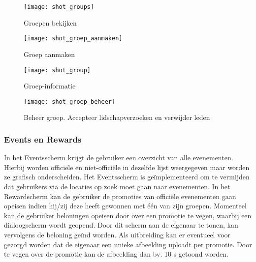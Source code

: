 \begin{figure}[ht]

\begin{minipage}[b]{0.25\linewidth}
\centering
\texttt{[image: shot\_groups]}
\caption{Groepen bekijken}
\label{fig:shot_groups}
\end{minipage}
\hspace{1cm}
\begin{minipage}[b]{0.25\linewidth}
\centering
\texttt{[image: shot\_groep\_aanmaken]}
\caption{Groep aanmaken}
\label{fig:shot_groep_aanmaken}
\end{minipage}
\hspace{1cm}
\begin{minipage}[b]{0.25\linewidth}
\centering
\texttt{[image: shot\_group]}
\caption{Groep-informatie}
\label{fig:shot_group}
\end{minipage}

\end{figure}

\begin{figure}[ht]
\centering
\begin{minipage}[b]{0.5\linewidth}
\centering
\texttt{[image: shot\_groep\_beheer]}
\caption{Beheer groep. Accepteer lidschapverzoeken en verwijder leden}
\label{fig:shot_groep_beheer}
\end{minipage}


\end{figure}

\clearpage

\subsubsection{Events en Rewards}%
In het Eventsscherm krijgt de gebruiker een overzicht van alle evenementen. Hierbij worden officiële en niet-officiële in dezelfde lijst weergegeven maar worden ze grafisch onderscheiden. Het Eventsscherm is geïmplementeerd om te vermijden dat gebruikers via de locaties op zoek moet gaan naar evenementen.
In het Rewardscherm kan de gebruiker de promoties van officiële evenementen gaan opeisen indien hij/zij deze heeft gewonnen met één van zijn groepen. Momenteel kan de gebruiker beloningen opeisen door over een promotie te vegen, waarbij een dialoogscherm wordt geopend. Door dit scherm aan de eigenaar te tonen, kan vervolgens de beloning geïnd worden. Als uitbreiding kan er eventueel voor gezorgd worden dat de eigenaar een unieke afbeelding uploadt per promotie. Door te vegen over de promotie kan de afbeelding dan bv. 10 s getoond worden.
